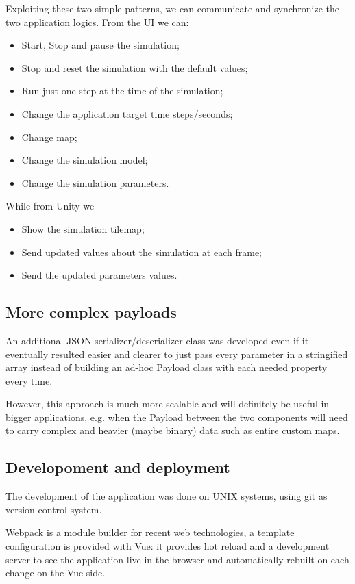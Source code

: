 Exploiting these two simple patterns, we can communicate and synchronize the two application logics. From the UI we can:

\begin{itemize}
\item Start, Stop and pause the simulation;
\item Stop and reset the simulation with the default values;
\item Run just one step at the time of the simulation;
\item Change the application target time steps/seconds;
\item Change map;
\item Change the simulation model;
\item Change the simulation parameters.
\end{itemize}

While from Unity we

\begin{itemize}
    \item Show the simulation tilemap;
    \item Send updated values about the simulation at each frame;
    \item Send the updated parameters values.
\end{itemize}

\subsection{More complex payloads}

An additional JSON serializer/deserializer class was developed even if it eventually resulted easier and clearer to just pass every parameter in a stringified array instead of building an ad-hoc Payload class with each needed property every time. 

However, this approach is much more scalable and will definitely be useful in bigger applications, e.g. when the Payload between the two components will need to carry complex and heavier (maybe binary) data such as entire custom maps.

\subsection{Developoment and deployment}

The development of the application was done on UNIX systems, using git as version control system.

Webpack is a module builder for recent web technologies, a template configuration is provided with Vue: it provides hot reload and a development server to see the application live in the browser and automatically rebuilt on each change on the Vue side.

